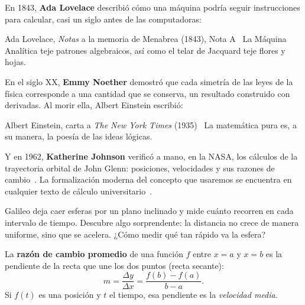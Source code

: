 \documentclass[11pt]{article}
\begin{document}
En 1843, \textbf{Ada Lovelace} describió cómo una máquina podría seguir
instrucciones para calcular, casi un siglo antes de las computadoras:

\begin{cita}{Ada Lovelace, \emph{Notas} a la memoria de Menabrea (1843), Nota A~\cite{lovelace1843}}
La Máquina Analítica teje patrones algebraicos, así como el telar de
Jacquard teje flores y hojas.
\end{cita}

En el siglo XX, \textbf{Emmy Noether} demostró que cada simetría de las
leyes de la física corresponde a una cantidad que se conserva, un
resultado construido con derivadas. Al morir ella, Albert Einstein
escribió:

\begin{cita}{Albert Einstein, carta a \emph{The New York Times} (1935)~\cite{einstein1935}}
La matemática pura es, a su manera, la poesía de las ideas lógicas.
\end{cita}

Y en 1962, \textbf{Katherine Johnson} verificó a mano, en la NASA, los
cálculos de la trayectoria orbital de John Glenn: posiciones, velocidades
y sus razones de cambio~\cite{shetterly2016}. La formalización moderna del
concepto que usaremos se encuentra en cualquier texto de cálculo
universitario~\cite{stewart2018}.

\label{tema:pendiente}

\begin{hilo}
Galileo deja caer esferas por un plano inclinado y mide cuánto recorren
en cada intervalo de tiempo. Descubre algo sorprendente: la distancia no
crece de manera uniforme, sino que se acelera. ¿Cómo medir qué tan
rápido va la esfera?
\end{hilo}

La \textbf{razón de cambio promedio} de una función $f$ entre $x=a$ y
$x=b$ es la pendiente de la recta que une los dos puntos (recta secante):
\[
  m = \frac{\Delta y}{\Delta x} = \frac{f(b)-f(a)}{b-a}.
\]
Si $f(t)$ es una posición y $t$ el tiempo, esa pendiente es la
\emph{velocidad media}.
\end{document}
